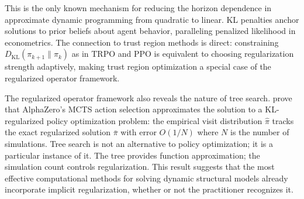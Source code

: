 This is the only known mechanism for reducing the horizon dependence in approximate dynamic programming from quadratic to linear. KL penalties anchor solutions to prior beliefs about agent behavior, paralleling penalized likelihood in econometrics. The connection to trust region methods is direct: constraining $D_{\text{KL}}(\pi_{k+1} \| \pi_k)$ as in TRPO and PPO is equivalent to choosing regularization strength adaptively, making trust region optimization a special case of the regularized operator framework.

The regularized operator framework also reveals the nature of tree search. \citet{grill2020planning} prove that AlphaZero's MCTS action selection approximates the solution to a KL-regularized policy optimization problem: the empirical visit distribution $\hat{\pi}$ tracks the exact regularized solution $\bar{\pi}$ with error $O(1/N)$ where $N$ is the number of simulations. Tree search is not an alternative to policy optimization; it is a particular instance of it. The tree provides function approximation; the simulation count controls regularization. This result suggests that the most effective computational methods for solving dynamic structural models already incorporate implicit regularization, whether or not the practitioner recognizes it.
